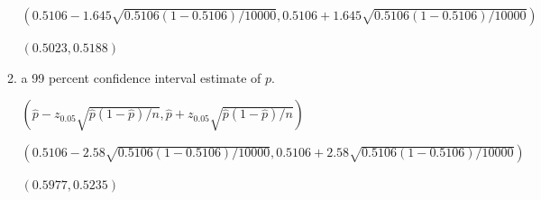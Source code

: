 \documentclass{article}
\begin{document}
\begin{enumerate}
\begin{enumerate}
        $(0.5106 - 1.645\sqrt{0.5106(1-0.5106)/10000}, 0.5106 + 1.645\sqrt{0.5106(1-0.5106)/10000})$

        $(0.5023, 0.5188)$
        \item a 99 percent confidence interval estimate of $p$.
        
        $(\hat{p} - z_{0.05}\sqrt{\hat{p}(1-\hat{p})/n}, \hat{p} + z_{0.05}\sqrt{\hat{p}(1-\hat{p})/n})$\

        $(0.5106 - 2.58\sqrt{0.5106(1-0.5106)/10000}, 0.5106 + 2.58\sqrt{0.5106(1-0.5106)/10000})$

        $(0.5977, 0.5235)$
    \end{enumerate}
\end{enumerate}
\end{document}

